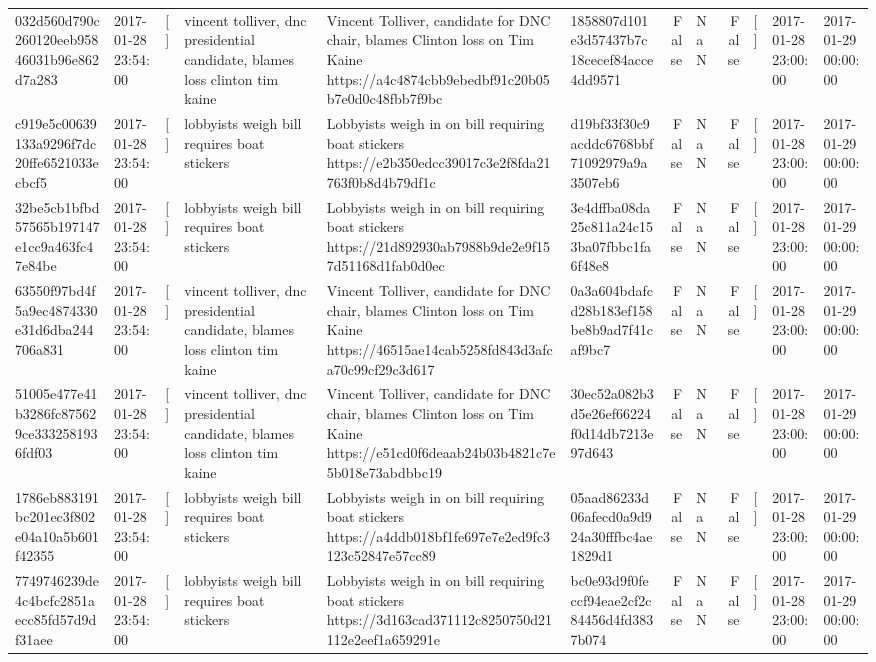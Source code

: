 \begin{tabular}{llllllrlrlll}
032d560d790c260120eeb95846031b96e862d7a283 & 2017-01-28 23:54:00 & [] & vincent tolliver, dnc presidential candidate, blames loss clinton tim kaine & Vincent Tolliver, candidate for DNC chair, blames Clinton loss on Tim Kaine https://a4c4874cbb9ebedbf91c20b05b7e0d0c48fbb7f9bc & 1858807d101e3d57437b7c18cecef84acce4dd9571 & False & NaN & False & [] & 2017-01-28 23:00:00 & 2017-01-29 00:00:00 \\
c919e5c00639133a9296f7dc20ffe6521033ecbcf5 & 2017-01-28 23:54:00 & [] & lobbyists weigh bill requires boat stickers & Lobbyists weigh in on bill requiring boat stickers https://e2b350edcc39017c3e2f8fda21763f0b8d4b79df1c & d19bf33f30c9acddc6768bbf71092979a9a3507eb6 & False & NaN & False & [] & 2017-01-28 23:00:00 & 2017-01-29 00:00:00 \\
32be5cb1bfbd57565b197147e1cc9a463fc47e84be & 2017-01-28 23:54:00 & [] & lobbyists weigh bill requires boat stickers & Lobbyists weigh in on bill requiring boat stickers https://21d892930ab7988b9de2e9f157d51168d1fab0d0ec & 3e4dffba08da25c811a24c153ba07fbbc1fa6f48e8 & False & NaN & False & [] & 2017-01-28 23:00:00 & 2017-01-29 00:00:00 \\
63550f97bd4f5a9ec4874330e31d6dba244706a831 & 2017-01-28 23:54:00 & [] & vincent tolliver, dnc presidential candidate, blames loss clinton tim kaine & Vincent Tolliver, candidate for DNC chair, blames Clinton loss on Tim Kaine https://46515ae14cab5258fd843d3afca70c99cf29c3d617 & 0a3a604bdafcd28b183ef158be8b9ad7f41caf9bc7 & False & NaN & False & [] & 2017-01-28 23:00:00 & 2017-01-29 00:00:00 \\
51005e477e41b3286fc875629ce3332581936fdf03 & 2017-01-28 23:54:00 & [] & vincent tolliver, dnc presidential candidate, blames loss clinton tim kaine & Vincent Tolliver, candidate for DNC chair, blames Clinton loss on Tim Kaine https://e51cd0f6deaab24b03b4821c7e5b018e73abdbbc19 & 30ec52a082b3d5e26ef66224f0d14db7213e97d643 & False & NaN & False & [] & 2017-01-28 23:00:00 & 2017-01-29 00:00:00 \\
1786eb883191bc201ec3f802e04a10a5b601f42355 & 2017-01-28 23:54:00 & [] & lobbyists weigh bill requires boat stickers & Lobbyists weigh in on bill requiring boat stickers https://a4ddb018bf1fe697e7e2ed9fc3123c52847e57cc89 & 05aad86233d06afecd0a9d924a30fffbc4ae1829d1 & False & NaN & False & [] & 2017-01-28 23:00:00 & 2017-01-29 00:00:00 \\
7749746239de4c4bcfc2851aecc85fd57d9df31aee & 2017-01-28 23:54:00 & [] & lobbyists weigh bill requires boat stickers & Lobbyists weigh in on bill requiring boat stickers https://3d163cad371112c8250750d21112e2eef1a659291e & bc0e93d9f0feccf94eae2cf2c84456d4fd3837b074 & False & NaN & False & [] & 2017-01-28 23:00:00 & 2017-01-29 00:00:00 \\

\end{tabular}
